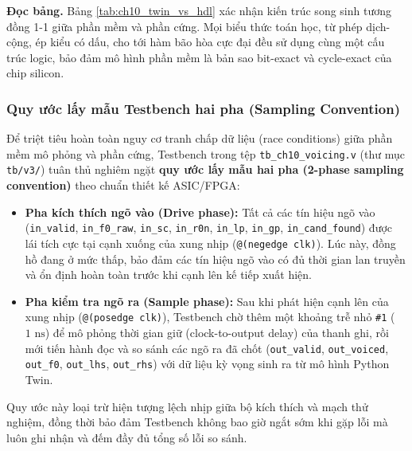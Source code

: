 \textbf{Đọc bảng.} Bảng \ref{tab:ch10_twin_vs_hdl} xác nhận kiến trúc song sinh tương đồng 1-1 giữa phần mềm và phần cứng. Mọi biểu thức toán học, từ phép dịch-cộng, ép kiểu có dấu, cho tới hàm bão hòa cực đại đều sử dụng cùng một cấu trúc logic, bảo đảm mô hình phần mềm là bản sao bit-exact và cycle-exact của chip silicon.

\subsubsection*{Quy ước lấy mẫu Testbench hai pha (Sampling Convention)}
Để triệt tiêu hoàn toàn nguy cơ tranh chấp dữ liệu (race conditions) giữa phần mềm mô phỏng và phần cứng, Testbench trong tệp \texttt{tb\_ch10\_voicing.v} (thư mục \texttt{tb/v3/}) tuân thủ nghiêm ngặt \textbf{quy ước lấy mẫu hai pha (2-phase sampling convention)} theo chuẩn thiết kế ASIC/FPGA:
\begin{itemize}
    \item \textbf{Pha kích thích ngõ vào (Drive phase):} Tất cả các tín hiệu ngõ vào (\texttt{in\_valid}, \texttt{in\_f0\_raw}, \texttt{in\_sc}, \texttt{in\_r0n}, \texttt{in\_lp}, \texttt{in\_gp}, \texttt{in\_cand\_found}) được lái tích cực tại cạnh xuống của xung nhịp (\texttt{@(negedge clk)}). Lúc này, đồng hồ đang ở mức thấp, bảo đảm các tín hiệu ngõ vào có đủ thời gian lan truyền và ổn định hoàn toàn trước khi cạnh lên kế tiếp xuất hiện.
    \item \textbf{Pha kiểm tra ngõ ra (Sample phase):} Sau khi phát hiện cạnh lên của xung nhịp (\texttt{@(posedge clk)}), Testbench chờ thêm một khoảng trễ nhỏ \texttt{\#1} ($1\text{ ns}$) để mô phỏng thời gian giữ (clock-to-output delay) của thanh ghi, rồi mới tiến hành đọc và so sánh các ngõ ra đã chốt (\texttt{out\_valid}, \texttt{out\_voiced}, \texttt{out\_f0}, \texttt{out\_lhs}, \texttt{out\_rhs}) với dữ liệu kỳ vọng sinh ra từ mô hình Python Twin.
\end{itemize}
Quy ước này loại trừ hiện tượng lệch nhịp giữa bộ kích thích và mạch thử nghiệm, đồng thời bảo đảm Testbench không bao giờ ngắt sớm khi gặp lỗi mà luôn ghi nhận và đếm đầy đủ tổng số lỗi so sánh.

